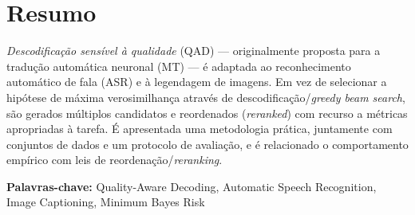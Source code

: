 
\section*{Resumo}


\emph{Descodificação sensível à qualidade} (QAD) — originalmente proposta para a tradução automática neuronal (MT) — é adaptada ao reconhecimento automático de fala (ASR) e à legendagem de imagens. Em vez de selecionar a hipótese de máxima verosimilhança através de descodificação/\emph{greedy beam search}, são gerados múltiplos candidatos e reordenados (\emph{reranked}) com recurso a métricas apropriadas à tarefa. É apresentada uma metodologia prática, juntamente com conjuntos de dados e um protocolo de avaliação, e é relacionado o comportamento empírico com leis de reordenação/\emph{reranking}.
\vfill

\textbf{\Large Palavras-chave:} Quality-Aware Decoding, Automatic Speech Recognition, Image Captioning, Minimum Bayes Risk

